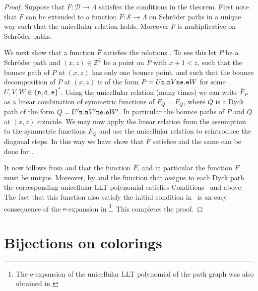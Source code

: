 \documentclass[reqno]{amsart}
\newcommand{\setZ}{\mathbb{Z}}
\newcommand{\estep}{\texttt{e}}
\newcommand{\dstep}{\texttt{d}}
\newcommand{\nstep}{\texttt{n}}
\newcommand{\bs}{{\kern-.08em\texttt{.}\kern-.13em}} %
\newcommand{\elementaryE}{\mathrm{e}}
\newcommand{\DYCK}[1]{\mathcal{D}_{#1}}     %
\newcommand{\SCH}[1]{\mathcal{S}_{#1}}     %
\begin{document}
\begin{proof}
Suppose that $F:\DYCK{}\to\Lambda$ satisfies the conditions in the theorem.
First note that $F$ can be extended to a function $\bar{F}:\SCH{}\to\Lambda$ on Schr{\"o}der paths in a unique way such that the unicellular relation  holds.
Moreover $\bar{F}$ is multiplicative on Schr{\"o}der paths.

We next show that a function $\bar{F}$ satisfies the relations .
To see this let $P$ be a Schr{\"o}der path and $(x,z)\in\setZ^2$ be a point on $P$ with $x+1<z$, such that the bounce path of $P$ at $(x,z)$ has only one bounce point, and such that the bounce decomposition of $P$ at $(x,z)$ is of the form $P=U{\nstep\bs\nstep}V{\nstep\estep\bs\estep}W$ for some $U,V,W\in\{\nstep,\dstep,\estep\}^*$.
Using the unicellular relation (many times) we can write $\bar{F}_{P}$ as a linear combination of symmetric functions of $\bar{F}_Q=F_Q$, where $Q$ is a Dyck path of the form $Q=U'{\nstep\bs\nstep}V'{\nstep\estep\bs\estep}W'$.
In particular the bounce paths of $P$ and $Q$ at $(x,z)$ coincide.
We may now apply the linear relation from the assumption to the symmetric functions $F_Q$ and use the unicellular relation to reintroduce the diagonal steps.
In this way we have show that $\bar{F}$ satisfies  and the same can be done for .

It now follows from  and  that the function $\bar{F}$, and in particular the function $F$ must be unique.
Moreover, by  and  the function that assigns to each Dyck path the corresponding unicellular LLT polynomial satisfies Conditions~ and  above.
The fact that this function also satisfy the initial 
condition in~ is an easy consequence of the $\elementaryE$-expansion in \footnote{The $\elementaryE$-expansion of the unicellular LLT polynomial of the path graph was also obtained in \cite[Prop.~5.18]{AlexanderssonPanova2016}}.
This completes the proof.
\end{proof}



\section{Bijections on colorings}
\label{Section:colorings}
\end{document}
